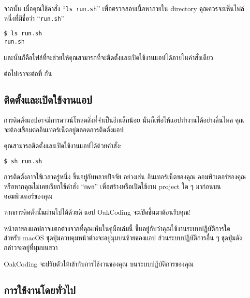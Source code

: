 \clearpage

จากนั้น เมื่อคุณใช้คำสั่ง ``\texttt{ls run.sh}'' เพื่อตรวจสอบเนื้อหาภายใน directory คุณควรจะเห็นไฟล์หนึ่งที่มีชื่อว่า ``\texttt{run.sh}''

\begin{lstlisting}[numbers=none]
$ ls run.sh
run.sh
\end{lstlisting}

และนั่นก็คือไฟล์ที่จะช่วยให้คุณสามารถที่จะติดตั้งและเปิดใช้งานแอปได้ภายในคำสั่งเดียว

ต่อไปเราจะต่อที่  กัน

\clearpage

\subsection{ติดตั้งและเปิดใช้งานแอป}
\label{subsec:launch-app}

\rule{0em}{1ex}

การติดตั้งแอปอาจมีการดาวน์โหลดสิ่งที่จำเป็นอีกเล็กน้อย
นั่นก็เพื่อให้แอปทำงานได้อย่างลื่นไหล
คุณจะต้องเชื่อมต่ออินเทอร์เน็ตอยู่ตลอดการติดตั้งแอป

คุณสามารถติดตั้งและเปิดใช้งานแอปได้ด้วยคำสั่ง:

\begin{lstlisting}[numbers=none]
$ sh run.sh
\end{lstlisting}

การติดตั้งอาจใช้เวลาครู่หนึ่ง ขึ้นอยู่กับหลายปัจจัย อย่างเช่น อินเทอร์เน็ตของคุณ
คอมพิวเตอร์ของคุณ หรือหากคุณไม่เคยเรียกใช้คำสั่ง ``\texttt{mvn}'' เพื่อสร้างหรือเปิดใช้งาน
project ใด ๆ มาก่อนบนคอมพิวเตอร์ของคุณ

หากการติดตั้งนั้นผ่านไปได้ด้วยดี แอป OakCoding จะเปิดขึ้นมาต้อนรับคุณ!


หน้าตาของแอปอาจแตกต่างจากที่คุณเห็นในคู่มือเล่มนี้
ขึ้นอยู่กับว่าคุณใช้งานระบบปฏิบัติการใด สำหรับ macOS ชุดปุ่มควบคุมหน้าต่างจะอยู่มุมบนซ้ายของแอป
ส่วนระบบปฏิบัติการอื่น ๆ ชุดปุ่มดังกล่าวจะอยู่ที่มุมบนขวา

OakCoding จะปรับตัวให้เข้ากับการใช้งานของคุณ บนระบบปฏิบัติการของคุณ

\clearpage

\subsection{การใช้งานโดยทั่วไป}


